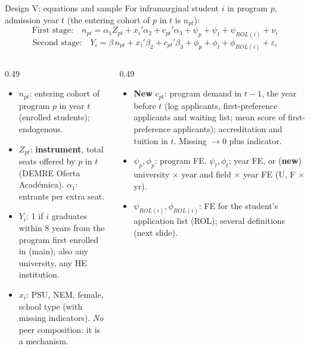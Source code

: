 \documentclass{beamer}
\begin{document}
\begin{frame}{Design V: equations and sample}
\scriptsize
For inframarginal student $i$ in program $p$, admission year $t$ (the entering cohort of $p$ in $t$ is $n_{pt}$):
\vspace{-0.15cm}
\[
\text{First stage:}\quad n_{pt} = \alpha_1 Z_{pt} + x_i'\alpha_2 + c_{pt}'\alpha_3 + \psi_p + \psi_t + \psi_{ROL(i)} + \nu_{i}
\]
\vspace{-0.25cm}
\[
\text{Second stage:}\quad Y_i = \beta\, n_{pt} + x_i'\beta_2 + c_{pt}'\beta_3 + \phi_p + \phi_t + \phi_{ROL(i)} + \varepsilon_{i}
\]
\vspace{-0.3cm}
\begin{columns}[T,onlytextwidth]
\begin{column}{0.49\textwidth}
\scriptsize
\begin{itemize}
    \setlength{\itemsep}{0pt}
    \item $n_{pt}$: entering cohort of program $p$ in year $t$ (enrolled students); endogenous.
    \item $Z_{pt}$: \textbf{instrument}, total seats offered by $p$ in $t$ (DEMRE Oferta Acad\'emica). $\alpha_1$: entrants per extra seat.
    \item $Y_i$: 1 if $i$ graduates within 8 years from the program first enrolled in (main); also any university, any HE institution.
    \item $x_i$: PSU, NEM, female, school type (with missing indicators). \emph{No} peer composition: it is a mechanism.\end{itemize}
\end{column}
\begin{column}{0.49\textwidth}
\scriptsize
\begin{itemize}
    \setlength{\itemsep}{0pt}
    \item \textbf{New} $c_{pt}$: program demand in $t-1$, the year before $t$ (log applicants, first-preference applicants and waiting list; mean score of first-preference applicants); accreditation and tuition in $t$. Missing $\to 0$ plus indicator.
    \item $\psi_p,\phi_p$: program FE. $\psi_t,\phi_t$: year FE, or (\textbf{new}) university $\times$ year and field $\times$ year FE (U, F $\times$ yr).
    \item $\psi_{ROL(i)},\phi_{ROL(i)}$: FE for the student's application list (ROL); several definitions (next slide).\end{itemize}
\end{column}
\end{columns}


\end{frame}
\end{document}
